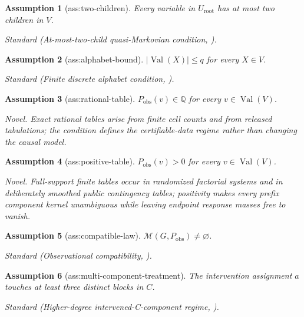 \documentclass{article}
\newtheorem{assumption}{Assumption}
\begin{document}
\begin{assumption}[ass:two-children]\label{ass:two-children}
Every variable in \(U_{\mathrm{root}}\) has at most two children in \(V\).
\par\smallskip\noindent\emph{Standard} (At-most-two-child quasi-Markovian condition, \cite{ZaffalonAntonucciCabanas2020}).
\end{assumption}

\begin{assumption}[ass:alphabet-bound]\label{ass:alphabet-bound}
\(|\operatorname{Val}(X)|\le q\) for every \(X\in V\).
\par\smallskip\noindent\emph{Standard} (Finite discrete alphabet condition, \cite{DuarteEtAl2023}).
\end{assumption}

\begin{assumption}[ass:rational-table]\label{ass:rational-table}
\(P_{\mathrm{obs}}(v)\in\mathbb Q\) for every \(v\in\operatorname{Val}(V)\).
\par\smallskip\noindent\emph{Novel.} Exact rational tables arise from finite cell counts and from released tabulations; the condition defines the certifiable-data regime rather than changing the causal model.
\end{assumption}

\begin{assumption}[ass:positive-table]\label{ass:positive-table}
\(P_{\mathrm{obs}}(v)>0\) for every \(v\in\operatorname{Val}(V)\).
\par\smallskip\noindent\emph{Novel.} Full-support finite tables occur in randomized factorial systems and in deliberately smoothed public contingency tables; positivity makes every prefix component kernel unambiguous while leaving endpoint response masses free to vanish.
\end{assumption}

\begin{assumption}[ass:compatible-law]\label{ass:compatible-law}
\(\mathcal M(G,P_{\mathrm{obs}})\ne\varnothing\).
\par\smallskip\noindent\emph{Standard} (Observational compatibility, \cite{DuarteEtAl2023}).
\end{assumption}

\begin{assumption}[ass:multi-component-treatment]\label{ass:multi-component-treatment}
The intervention assignment \(a\) touches at least three distinct blocks in \(C\).
\par\smallskip\noindent\emph{Standard} (Higher-degree intervened-C-component regime, \cite{ShridharanIyengar2023}).
\end{assumption}
\end{document}

